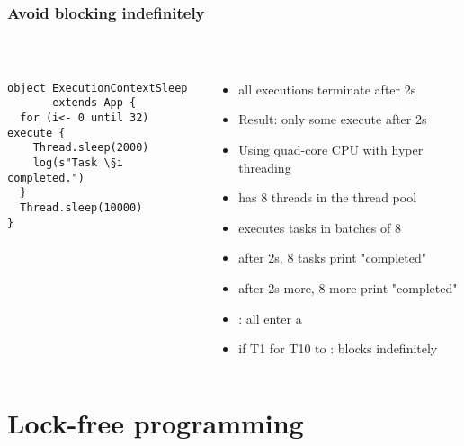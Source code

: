 \documentclass[aspectratio=169]{beamer}
\begin{document}
\begin{frame}[fragile]\frametitle{Avoid blocking indefinitely}
~\\[-8mm]
\begin{columns}
\begin{column}{0.45\textwidth}
\begin{lstlisting}[emph={execute,sleep,log,global}]
object ExecutionContextSleep
       extends App {
  for (i<- 0 until 32) execute {
    Thread.sleep(2000)
    log(s"Task \§i completed.")
  }
  Thread.sleep(10000)
}
\end{lstlisting}
\end{column}
\begin{column}{0.57\textwidth}
\begin{itemize}
  \item {} all executions terminate after 2s
  \item \alert{Result:} only some execute after 2s %
  \pause\\[4mm]
  \item Using quad-core CPU with hyper threading
  \item {} has 8 threads in the thread pool
  \pause\\[4mm]
  \item executes tasks in batches of 8
  \item after 2s, 8 tasks print "completed"
  \item after 2s more, 8 more print "completed"
  \item {}: all enter a 
  \pause\\[4mm]
  \item if T1  for T10 to : \alert{blocks indefinitely}
\end{itemize}
\end{column}
\end{columns}
\end{frame}



\section{Lock-free programming}
\end{document}
